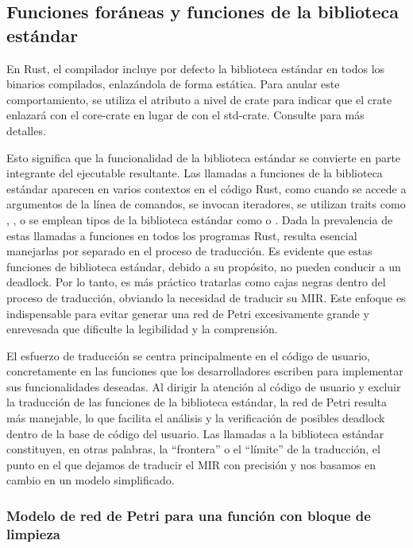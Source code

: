 \subsection{Funciones foráneas y funciones de la biblioteca estándar}

En Rust, el compilador incluye por defecto la biblioteca estándar en todos los binarios
compilados, enlazándola de forma estática. Para anular este
comportamiento, se utiliza el atributo a nivel de crate \Rustinline{#![no_std]} para indicar que el crate
enlazará con el core-crate en lugar de con el std-crate. Consulte \cite{embedded-book} para más detalles.

Esto significa que la funcionalidad de la biblioteca estándar se convierte en parte
integrante del ejecutable resultante. Las llamadas a funciones de la biblioteca estándar
aparecen en varios contextos en el código Rust, como cuando se accede a argumentos
de la línea de comandos, se invocan iteradores,
se utilizan traits como , ,
o se emplean tipos de la biblioteca estándar como
 o .
Dada la prevalencia de estas llamadas a
funciones en todos los programas Rust, resulta esencial manejarlas por separado en el
proceso de traducción. Es evidente que estas funciones de biblioteca estándar, debido a su
propósito, no pueden conducir a un deadlock. Por lo tanto, es más práctico tratarlas
como cajas negras dentro del proceso de traducción, obviando la necesidad de traducir su
\acrshort{MIR}. Este enfoque es indispensable para evitar generar una red de Petri excesivamente
grande y enrevesada que dificulte la legibilidad y la comprensión.

El esfuerzo de traducción se centra principalmente en el código de usuario, concretamente en
las funciones que los desarrolladores escriben para implementar sus funcionalidades deseadas.
Al dirigir la atención al código de usuario y excluir la traducción de las funciones de la
biblioteca estándar, la red de Petri resulta más manejable, lo que facilita el
análisis y la verificación de posibles deadlock dentro de la base de código del usuario.
Las llamadas a la biblioteca estándar constituyen, en otras palabras, la ``frontera'' o el ``límite'' de la
traducción, el punto en el que dejamos de traducir el \acrshort{MIR} con precisión y nos basamos en
cambio en un modelo simplificado.

\subsubsection{Modelo de red de Petri para una función con bloque de limpieza}

